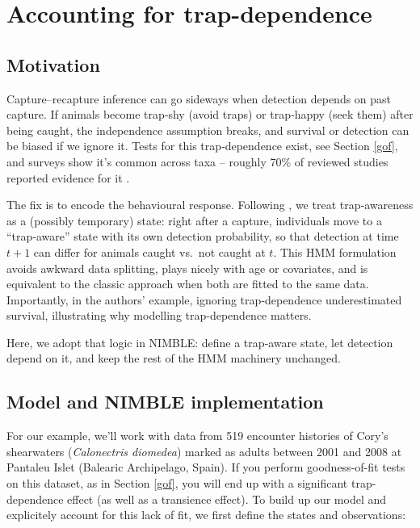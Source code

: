 \documentclass[
  12pt,
]{krantz}
\begin{document}
\section{Accounting for trap-dependence}\label{trapdep}

\subsection{Motivation}\label{motivation-3}

Capture--recapture inference can go sideways when detection depends on past capture. If animals become trap‐shy (avoid traps) or trap‐happy (seek them) after being caught, the independence assumption breaks, and survival or detection can be biased if we ignore it. Tests for this trap‐dependence exist, see Section \ref{gof}, and surveys show it's common across taxa -- roughly 70\% of reviewed studies reported evidence for it \citet{pradeltrapdep2012}.

The fix is to encode the behavioural response. Following \citet{pradeltrapdep2012}, we treat trap‐awareness as a (possibly temporary) state: right after a capture, individuals move to a ``trap‐aware'' state with its own detection probability, so that detection at time \(t+1\) can differ for animals caught vs.~not caught at \(t\). This HMM formulation avoids awkward data splitting, plays nicely with age or covariates, and is equivalent to the classic approach when both are fitted to the same data. Importantly, in the authors' example, ignoring trap‐dependence underestimated survival, illustrating why modelling trap-dependence matters.

Here, we adopt that logic in NIMBLE: define a trap‐aware state, let detection depend on it, and keep the rest of the HMM machinery unchanged.

\subsection{Model and NIMBLE implementation}\label{model-and-nimble-implementation-3}

For our example, we'll work with data from 519 encounter histories of Cory's shearwaters (\emph{Calonectris diomedea}) marked as adults between 2001 and 2008 at Pantaleu Islet (Balearic Archipelago, Spain). If you perform goodness-of-fit tests on this dataset, as in Section \ref{gof}, you will end up with a significant trap-dependence effect (as well as a transience effect). To build up our model and explicitely account for this lack of fit, we first define the states and observations:
\end{document}
